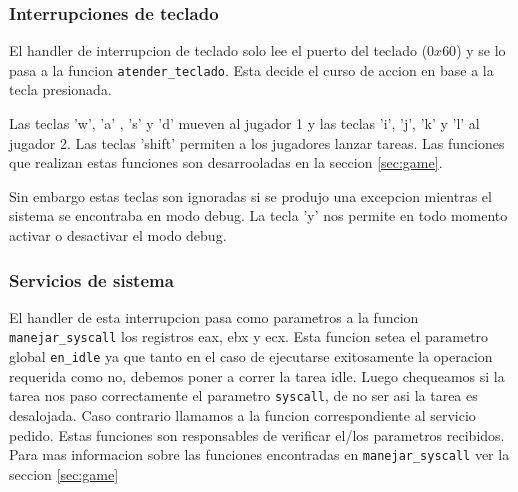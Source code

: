 \subsubsection{Interrupciones de teclado}

El handler de interrupcion de teclado solo lee el puerto del teclado ($0x60$) y se lo pasa a la funcion \verb|atender_teclado|. Esta decide el curso de accion en base a la tecla presionada. 

Las teclas 'w', 'a' , 's' y 'd' mueven al jugador 1 y las teclas 'i', 'j', 'k' y 'l' al jugador 2. Las teclas 'shift' permiten a los jugadores lanzar tareas. Las funciones que realizan estas funciones son desarrooladas en la seccion \ref{sec:game}. 

Sin embargo estas teclas son ignoradas si se produjo una excepcion mientras el sistema se encontraba en modo debug. La tecla 'y' nos permite en todo momento activar o desactivar el modo debug.


\subsubsection{Servicios de sistema}

El handler de esta interrupcion pasa como parametros a la funcion \verb|manejar_syscall| los registros eax, ebx y ecx. Esta funcion setea el parametro global \verb|en_idle| ya que tanto en el caso de ejecutarse exitosamente la operacion requerida como no, debemos poner a correr la tarea idle. Luego chequeamos si la tarea nos paso correctamente el parametro \verb|syscall|, de no ser asi la tarea es desalojada. Caso contrario llamamos a la funcion correspondiente al servicio pedido. Estas funciones son responsables de verificar el/los parametros recibidos.
Para mas informacion sobre  las funciones encontradas en \verb|manejar_syscall| ver la seccion \ref{sec:game}

